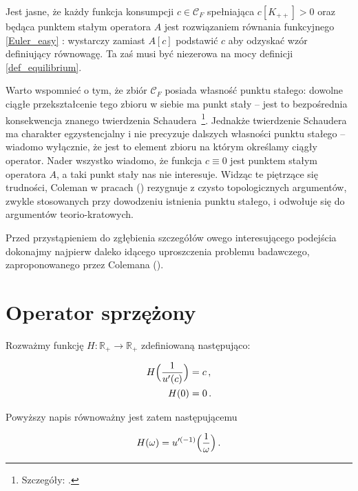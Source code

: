 Jest jasne, że każdy funkcja konsumpcji $ c \in \mathcal{C}_F $ spełniająca $ c[K_{++}]>0 $ oraz będąca punktem stałym operatora $ A $ jest rozwiązaniem równania funkcyjnego \ref{Euler_easy} : wystarczy zamiast $A[c]$ podstawić $c$ aby odzyskać wzór definiujący równowagę. Ta zaś musi być niezerowa na mocy definicji \ref{def_equilibrium}.

Warto wspomnieć o tym, że zbiór $ \mathcal{C}_F $ posiada własność punktu stałego: dowolne ciągłe przekształcenie tego zbioru w siebie ma punkt stały -- jest to bezpośrednia konsekwencja znanego twierdzenia Schaudera~\footnote{Szczegóły: \citet[][str. 119]{Granas_FPT}.}. Jednakże twierdzenie Schaudera ma charakter egzystencjalny i nie precyzuje dalszych własności punktu stałego -- wiadomo wyłącznie, że jest to element zbioru na którym określamy ciągły operator. Nader wszystko wiadomo, że funkcja $ c \equiv 0 $ jest punktem stałym operatora $ A $, a taki punkt stały nas nie interesuje. Widząc te piętrzące się trudności, Coleman w pracach (\citeyear{Coleman1, Coleman2}) rezygnuje z czysto topologicznych argumentów, zwykle stosowanych przy dowodzeniu istnienia punktu stałego, i odwołuje się do argumentów teorio-kratowych. 

Przed przystąpieniem do zgłębienia szczegółów owego interesującego podejścia dokonajmy najpierw daleko idącego uproszczenia problemu badawczego, zaproponowanego przez Colemana (\citeyear{Coleman2}). 




\section{Operator sprzężony}\label{conjugate_operator}

Rozważmy funkcję $ H: \mathbb{R}_{+} \rightarrow \mathbb{R}_{+} $ zdefiniowaną następująco:

\begin{align*}
\begin{split}
H\Bigl(\frac{1}{u'(c)} \Bigl) &= c\,, \\
H(0) &= 0 \,.\\
\end{split}
\end{align*}

Powyższy napis równoważny jest zatem następującemu

\begin{equation*}
H(\omega) = u'^{(-1)}\Bigl(\frac{1}{\omega}\Bigl)\,.
\end{equation*}

